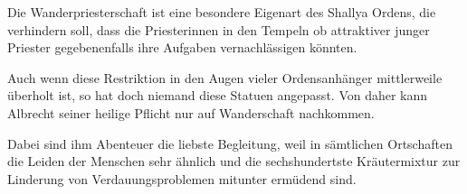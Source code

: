 
Die Wanderpriesterschaft ist eine besondere Eigenart des Shallya Ordens, die verhindern soll, dass die Priesterinnen in den Tempeln ob attraktiver junger Priester gegebenenfalls ihre Aufgaben vernachlässigen könnten.  

Auch wenn diese Restriktion in den Augen vieler Ordensanhänger mittlerweile überholt ist, so hat doch niemand diese Statuen angepasst. Von daher kann Albrecht seiner heilige Pflicht nur auf Wanderschaft nachkommen.  

Dabei sind ihm Abenteuer die liebste Begleitung, weil in sämtlichen Ortschaften die Leiden der Menschen sehr ähnlich und die sechshundertste Kräutermixtur zur Linderung von Verdauungsproblemen mitunter ermüdend sind.
